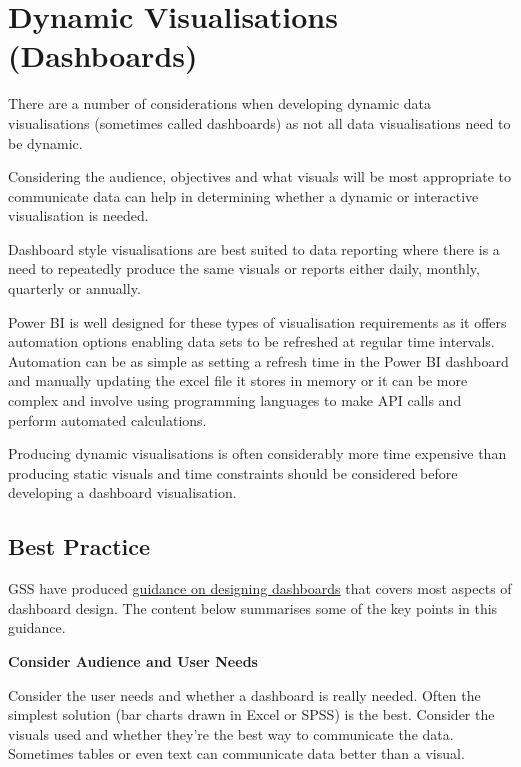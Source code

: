 \documentclass[
]{book}
\begin{document}
\hypertarget{dynamic-visualisations-dashboards}{%
\section{Dynamic Visualisations (Dashboards)}\label{dynamic-visualisations-dashboards}}

There are a number of considerations when developing dynamic data visualisations (sometimes called dashboards) as not all data visualisations need to be dynamic.

Considering the audience, objectives and what visuals will be most appropriate to communicate data can help in determining whether a dynamic or interactive visualisation is needed.

Dashboard style visualisations are best suited to data reporting where there is a need to repeatedly produce the same visuals or reports either daily, monthly, quarterly or annually.

Power BI is well designed for these types of visualisation requirements as it offers automation options enabling data sets to be refreshed at regular time intervals.
Automation can be as simple as setting a refresh time in the Power BI dashboard and manually updating the excel file it stores in memory or it can be more complex and involve using programming languages to make API calls and perform automated calculations.

Producing dynamic visualisations is often considerably more time expensive than producing static visuals and time constraints should be considered before developing a dashboard visualisation.

\hypertarget{best-practice}{%
\subsection{Best Practice}\label{best-practice}}

GSS have produced \href{https://gss.civilservice.gov.uk/policy-store/top-tips-for-designing-dashboards/}{guidance on designing dashboards} that covers most aspects of dashboard design. The content below summarises some of the key points in this guidance.

\textbf{Consider Audience and User Needs}

Consider the user needs and whether a dashboard is really needed. Often the simplest solution (bar charts drawn in Excel or SPSS) is the best. Consider the visuals used and whether they're the best way to communicate the data. Sometimes tables or even text can communicate data better than a visual.
\end{document}
